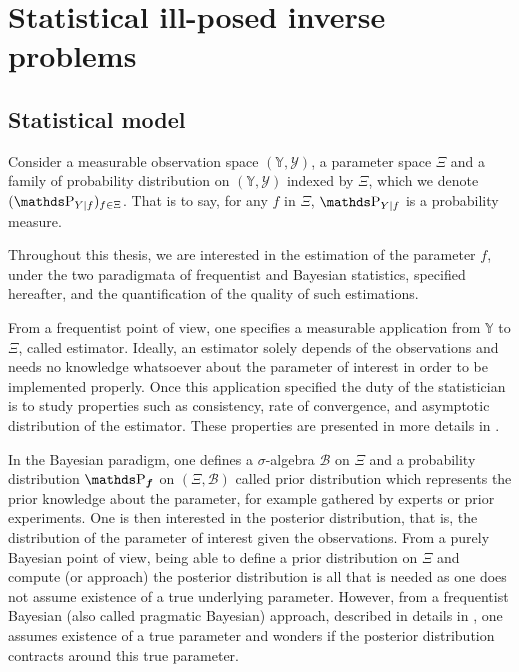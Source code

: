 \section{Statistical ill-posed inverse problems}\label{1.1}

\subsection{Statistical model}\label{1.1.1}

Consider a measurable observation space $(\mathds{Y}, \mathcal{Y})$, a parameter space $\Xi$ and a family of probability distribution on $(\mathds{Y}, \mathcal{Y})$ indexed by $\Xi$, which we denote $(\P_{Y \vert f})_{f \in \Xi}$.
That is to say, for any $f$ in $\Xi$, $\P_{Y \vert f}$ is a probability measure.

\bigskip

Throughout this thesis, we are interested in the estimation of the parameter $f$, under the two paradigmata of frequentist and Bayesian statistics, specified hereafter, and the quantification of the quality of such estimations.

From a frequentist point of view, one specifies a measurable application from $\mathds{Y}$ to $\Xi$, called estimator.
Ideally, an estimator solely depends of the observations and needs no knowledge whatsoever about the parameter of interest in order to be implemented properly.
Once this application specified the duty of the statistician is to study properties such as consistency, rate of convergence, and asymptotic distribution of the estimator.
These properties are presented in more details in .

\medskip

In the Bayesian paradigm, one defines a $\sigma$-algebra $\mathcal{B}$ on $\Xi$ and a probability distribution $\P_{\boldsymbol{f}}$ on $(\Xi, \mathcal{B})$ called prior distribution which represents the prior knowledge about the parameter, for example gathered by experts or prior experiments.
One is then interested in the posterior distribution, that is, the distribution of the parameter of interest given the observations.
From a purely Bayesian point of view, being able to define a prior distribution on $\Xi$ and compute (or approach) the posterior distribution is all that is needed as one does not assume existence of a true underlying parameter.
However, from a frequentist Bayesian (also called pragmatic Bayesian) approach, described in details in , one assumes existence of a true parameter and wonders if the posterior distribution contracts around this true parameter.

